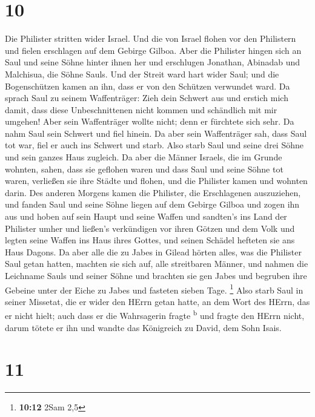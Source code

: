 \hypertarget{section-9}{%
\section{10}\label{section-9}}

 Die Philister stritten wider Israel. Und die von Israel
flohen vor den Philistern und fielen erschlagen auf dem Gebirge Gilboa.
 Aber die Philister hingen sich an Saul und seine Söhne
hinter ihnen her und erschlugen Jonathan, Abinadab und Malchisua, die
Söhne Sauls.  Und der Streit ward hart wider Saul; und die
Bogenschützen kamen an ihn, dass er von den Schützen verwundet ward.
 Da sprach Saul zu seinem Waffenträger: Zieh dein Schwert
aus und erstich mich damit, dass diese Unbeschnittenen nicht kommen und
schändlich mit mir umgehen! Aber sein Waffenträger wollte nicht; denn er
fürchtete sich sehr. Da nahm Saul sein Schwert und fiel hinein.
 Da aber sein Waffenträger sah, dass Saul tot war, fiel er
auch ins Schwert und starb.  Also starb Saul und seine
drei Söhne und sein ganzes Haus zugleich.  Da aber die
Männer Israels, die im Grunde wohnten, sahen, dass sie geflohen waren
und dass Saul und seine Söhne tot waren, verließen sie ihre Städte und
flohen, und die Philister kamen und wohnten darin.  Des
anderen Morgens kamen die Philister, die Erschlagenen auszuziehen, und
fanden Saul und seine Söhne liegen auf dem Gebirge Gilboa 
und zogen ihn aus und hoben auf sein Haupt und seine Waffen und
sandten's ins Land der Philister umher und ließen's verkündigen vor
ihren Götzen und dem Volk  und legten seine Waffen ins
Haus ihres Gottes, und seinen Schädel hefteten sie ans Haus Dagons.
 Da aber alle die zu Jabes in Gilead hörten alles, was
die Philister Saul getan hatten,  machten sie sich auf,
alle streitbaren Männer, und nahmen die Leichname Sauls und seiner Söhne
und brachten sie gen Jabes und begruben ihre Gebeine unter der Eiche zu
Jabes und fasteten sieben Tage. \footnote{\textbf{10:12} 2Sam 2,5}
 Also starb Saul in seiner Missetat, die er wider den
HErrn getan hatte, an dem Wort des HErrn, das er nicht hielt; auch dass
er die Wahrsagerin fragte \textsuperscript{b}  und fragte
den HErrn nicht, darum tötete er ihn und wandte das Königreich zu David,
dem Sohn Isais.

\hypertarget{section-10}{%
\section{11}\label{section-10}}

